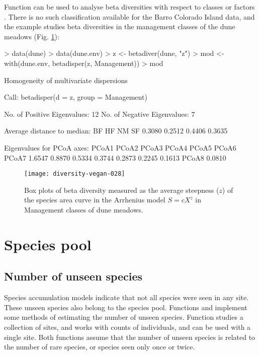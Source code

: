 \documentclass[a4paper,10pt,twocolumn]{article}
\begin{document}
Function  can be used to analyse beta diversities
with respect to classes or factors \citep{Anderson06, AndersonEtal06}.
There is no such classification available for the Barro Colorado
Island data, and the example studies beta diversities in the
management classes of the dune meadows (Fig. \ref{fig:betadisper}):
\begin{Schunk}
\begin{Sinput}
> data(dune)
> data(dune.env)
> z <- betadiver(dune, "z")
> mod <- with(dune.env, betadisper(z, Management))
> mod
\end{Sinput}
\begin{Soutput}
	Homogeneity of multivariate dispersions

Call: betadisper(d = z, group = Management)

No. of Positive Eigenvalues: 12
No. of Negative Eigenvalues: 7

Average distance to median:
    BF     HF     NM     SF 
0.3080 0.2512 0.4406 0.3635 

Eigenvalues for PCoA axes:
 PCoA1  PCoA2  PCoA3  PCoA4  PCoA5  PCoA6  PCoA7 
1.6547 0.8870 0.5334 0.3744 0.2873 0.2245 0.1613 
 PCoA8 
0.0810 
\end{Soutput}
\end{Schunk}
\begin{figure}
\texttt{[image: diversity-vegan-028]}
\caption{Box plots of beta diversity measured as the average steepness
  ($z$) of the species area curve in the Arrhenius model $S = cX^z$ in
  Management classes of dune meadows.}
\label{fig:betadisper}
\end{figure}

\section{Species pool}
\subsection{Number of unseen species}

Species accumulation models indicate that not all species were seen in
any site.  These unseen species also belong to the species pool.
Functions  and  implement some
methods of estimating the number of unseen species.  Function
 studies a collection of sites, and
 works with counts of individuals, and can be used
with a single site.  Both functions assume that the number of unseen
species is related to the number of rare species, or species seen only
once or twice.
\end{document}
